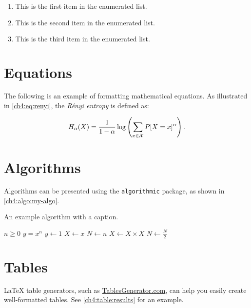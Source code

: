 \begin{enumerate}[itemindent=\subsubparitemindent]
    \item This is the first item in the enumerated list.
    \item This is the second item in the enumerated list.
    \item This is the third item in the enumerated list.
\end{enumerate}

\section{Equations}
\begin{paragraph}
The following is an example of formatting mathematical equations. As illustrated in \autoref{ch4:eq:renyi}, the {\em R\'enyi entropy} is defined as:
\end{paragraph}

\begin{equation}
\label{ch4:eq:renyi}
H_{\alpha}(X) =
\frac{1}{1-\alpha}
\log \left(\sum_{x \in {\cal X}}P[X=x]^{\alpha} \right) .
\end{equation}

\section{Algorithms}
\begin{paragraph}
Algorithms can be presented using the \texttt{algorithmic} package, as shown in \autoref{ch4:algo:my-algo}.
\end{paragraph}

\begin{algorithm}[h]
\caption{An example algorithm with a caption.}
\label{ch4:algo:my-algo}
\normalsize\singlespacing
\begin{algorithmic}[1]
    \Require $n \geq 0$
    \Ensure $y = x^n$
    \State $y \gets 1$
    \State $X \gets x$
    \State $N \gets n$
            \State $X \gets X \times X$
            \State $N \gets \frac{N}{2}$ 
    \EndWhile
\end{algorithmic}
\end{algorithm}

\section{Tables}
\begin{paragraph}
{\LaTeX} table generators, such as \href{https://www.tablesgenerator.com/}{TablesGenerator.com}, can help you easily create well-formatted tables. See \autoref{ch4:table:results} for an example.
\end{paragraph}

